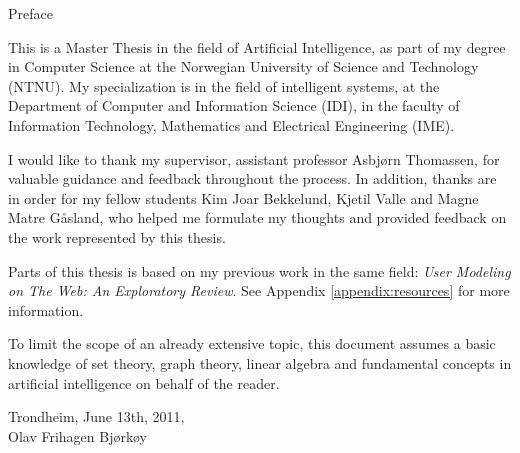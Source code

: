 \null\vspace{7em}
{
  \centering
  \normalfont
  \huge
  Preface\\
}
\vspace{2em}

\noindent
This is a Master Thesis in the field of Artificial Intelligence,
as part of my degree in Computer Science
at the Norwegian University of Science and Technology (NTNU).
My specialization is in the field of intelligent systems, 
at the Department of Computer and Information Science (IDI), 
in the faculty of Information Technology, Mathematics and Electrical Engineering (IME).

I would like to thank my supervisor, assistant professor Asbjørn Thomassen, for valuable guidance and feedback throughout the process.
In addition, thanks are in order for my fellow students 
Kim Joar Bekkelund, Kjetil Valle and Magne Matre Gåsland,
who helped me formulate my thoughts and provided feedback on the work represented by this thesis.

Parts of this thesis is based on my previous work in the same field: 
\emph{User Modeling on The Web: An Exploratory Review}.
See Appendix \ref{appendix:resources} for more information.

To limit the scope of an already extensive topic, 
this document assumes a basic knowledge of set theory, 
graph theory, linear algebra and fundamental concepts in artificial intelligence 
on behalf of the reader.

\vspace{1em}
\begin{flushleft}
  Trondheim, June 13th, 2011,\\
  Olav Frihagen Bjørkøy\\
\end{flushleft}

\cleardoublepage
